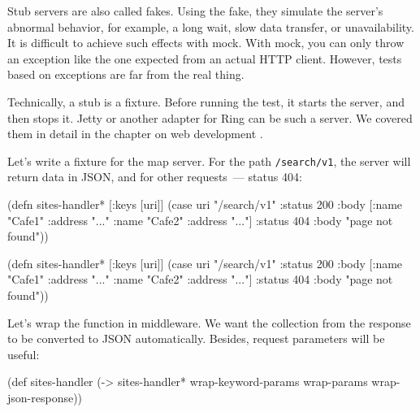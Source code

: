 Stub servers are also called fakes. Using the fake, they simulate the server's abnormal behavior, for example, a long wait, slow data transfer, or unavailability. It is difficult to achieve such effects with mock. With mock, you can only throw an exception like the one expected from an actual HTTP client. However, tests based on exceptions are far from the real thing.

Technically, a stub is a fixture. Before running the test, it starts the server, and then stops it. Jetty or another adapter for Ring can be such a server. We covered them in detail in the chapter on web development .

Let's write a fixture for the map server. For the path \verb|/search/v1|, the server will return data in JSON, and for other requests~--- status 404:

\label{sites-handler}

\ifx\DEVICETYPE\MOBILE

\begin{english}
  \begin{clojure}
(defn sites-handler* [{:keys [uri]}]
  (case uri
    "/search/v1"
    {:status 200
     :body [{:name "Cafe1"
             :address "..."}
            {:name "Cafe2"
             :address "..."}]}
    {:status 404
     :body "page not found"}))
  \end{clojure}
\end{english}

\else

\begin{english}
  \begin{clojure}
(defn sites-handler* [{:keys [uri]}]
  (case uri
    "/search/v1"
    {:status 200 :body [{:name "Cafe1" :address "..."}
                        {:name "Cafe2" :address "..."}]}
    {:status 404 :body "page not found"}))
  \end{clojure}
\end{english}

\fi


Let's wrap the function in middleware. We want the collection from the response to be converted to JSON automatically. Besides, request parameters will be useful:

\begin{english}
  \begin{clojure}
(def sites-handler
  (-> sites-handler*
      wrap-keyword-params
      wrap-params
      wrap-json-response))
  \end{clojure}
\end{english}

